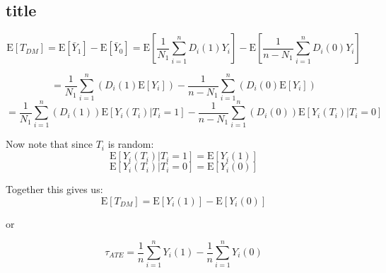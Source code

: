 \documentclass[11pt]{article}
\newcommand{\E}{\mathrm{E}}
\begin{document}
 \subsection{title}
 
 $$\E[T_{DM}] = \E[\bar{Y}_1] - \E[\bar{Y}_0] = \E \left[ \frac{1}{N_1} \sum_{i=1}^{n} D_i(1) Y_i  \right]  
 -  \E \left[ \frac{1}{n-N_1} \sum_{i=1}^{n} D_i(0) Y_i  \right]  $$
 
 $$ =  \frac{1}{N_1} \sum_{i=1}^{n} \left(  D_i(1) \E[Y_i] \right) - \frac{1}{n-N_1} \sum_{i=1}^{n} \left(  D_i(0) \E[Y_i] \right) $$
 $$=  \frac{1}{N_1} \sum_{i=1}^{n} \left( D_i(1) \right) \E[Y_i(T_i)|T_i = 1]  - \frac{1}{n-N_1} \sum_{i=1}^{n} \left( D_i(0) \right) \E[Y_i(T_i)|T_i =0] $$
 
 Now note that since $T_i$ is random: 
 $$ \E[Y_i(T_i)|T_i = 1] = \E[Y_i(1)] $$
 $$ \E[Y_i(T_i)|T_i = 0] = \E[Y_i(0)] $$
 
 Together this gives us: 
  $$\E[T_{DM}] = \E[Y_i(1)] - \E[Y_i(0)] $$
  
 or
 
 $$\tau_{ATE} = \frac{1}{n} \sum_{i=1}^{n} Y_i(1) - \frac{1}{n} \sum_{i=1}^{n} Y_i(0) $$
\end{document}
